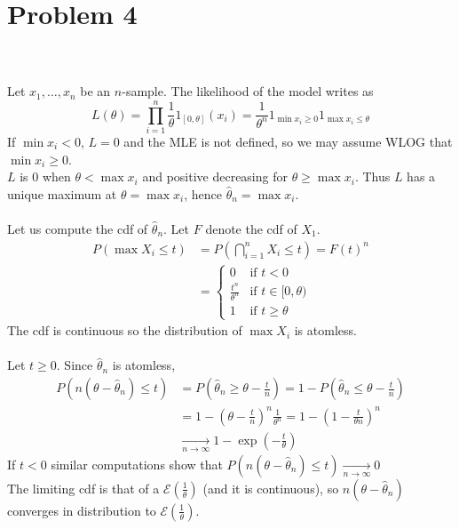 \documentclass[a4paper,11pt]{article}
\begin{document}
\section*{Problem 4}
\noindent{}
\\ \\
Let $x_1,\ldots,x_n$ be an $n$-sample. The likelihood of the model writes as $$L(\theta) = \prod_{i=1}^n \frac 1\theta 1_{[0,\theta]}(x_i)=\frac{1}{\theta^n} 1_{\min x_i\geq 0}1_{\max x_i\leq \theta}$$
If $\min x_i< 0$, $L=0$ and the MLE is not defined, so we may assume WLOG that $\min x_i\geq 0$.\\
$L$ is $0$ when $\theta <\max x_i$ and positive decreasing for $\theta \geq \max x_i$. Thus $L$ has a unique maximum at $\theta = \max x_i$, hence $\hat \theta_n = \max x_i$.\\
\\
Let us compute the cdf of $\hat \theta_n$. Let $F$ denote the cdf of $X_1$. $$\begin{aligned}
  P(\max X_i \leq t) &= P(\bigcap_{i=1}^n X_i\leq t) = F(t)^n\\
  &= \begin{cases}
    0 &\text{if } t<0\\
    \frac{t^n}{\theta^n} &\text{if } t\in [0,\theta)\\
    1 &\text{if } t\geq \theta
  \end{cases}
\end{aligned}$$
The cdf is continuous so the distribution of $\max X_i$ is atomless.\\
\\
Let $t\geq 0$. Since $\hat \theta_n$ is atomless, 
$$\begin{aligned}
  P(n(\theta-\hat \theta_n)\leq t) &= P(\hat \theta_n \geq \theta - \frac tn) = 1-P(\hat \theta_n\leq \theta-\frac tn)\\
  &= 1-\left(\theta-\frac tn \right)^n\frac{1}{\theta^n} = 1-\left(1-\frac t{\theta n} \right)^n\\
  &\xrightarrow[n\to \infty]{} 1-\exp(-\frac{t}{\theta})
\end{aligned}$$ 
If $t<0$ similar computations show that $P(n(\theta-\hat \theta_n)\leq t) \xrightarrow[n\to \infty]{} 0$\\
The limiting cdf is that of a $\mathcal E(\frac 1\theta)$ (and it is continuous), so $n(\theta-\hat \theta_n)$ converges in distribution to $\mathcal E(\frac 1\theta)$.
\end{document}
